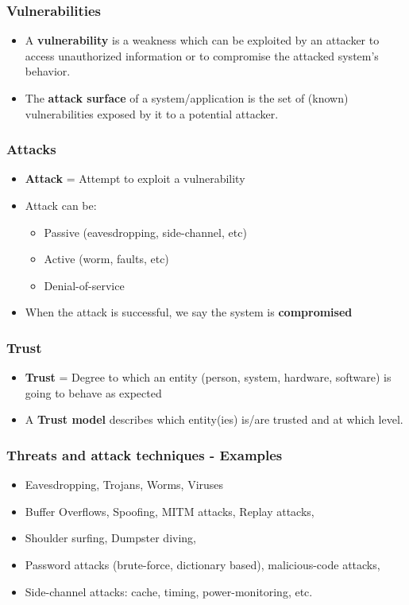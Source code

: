 \documentclass[
hyperref={pdfpagelabels=false}
,xcolor=table
]
{beamer}
\begin{document}
\begin{frame}
  \frametitle{Vulnerabilities}
  \begin{itemize}
  \item A \textbf{vulnerability} is a weakness which can be exploited by an
    attacker to access unauthorized information or to compromise the
    attacked system's behavior. 
  \item The \textbf{attack surface} of a system/application is the set of
    (known) vulnerabilities exposed by it to a potential attacker.
  \end{itemize}
\end{frame}


\begin{frame}
  \frametitle{Attacks}
  \begin{itemize}
  \item \textbf{Attack} = Attempt to exploit a vulnerability
  \item Attack can be:
    \begin{itemize}
    \item Passive (eavesdropping, side-channel, etc)
    \item Active (worm, faults, etc)
    \item Denial-of-service
    \end{itemize}
  \item When the attack is successful, we say the system is \textbf{compromised} 
  \end{itemize}
\end{frame}


\begin{frame}
  \frametitle{Trust}
  \begin{itemize}
  \item \textbf{Trust} = Degree to which an entity (person, system, hardware, software) is going to behave as expected
  \item A \textbf{Trust model} describes which entity(ies) is/are
    trusted and at which level.
  \end{itemize}
\end{frame}

\begin{frame}
  \frametitle{Threats and attack techniques - Examples}

  \begin{itemize}
  \item Eavesdropping, Trojans, Worms, Viruses
  \item Buffer Overflows, Spoofing, MITM attacks, Replay attacks, 
  \item Shoulder surfing, Dumpster diving, 
  \item Password attacks (brute-force, dictionary based), malicious-code attacks, 
  \item Side-channel attacks: cache, timing, power-monitoring, etc.
  \end{itemize}
\end{frame}
\end{document}
